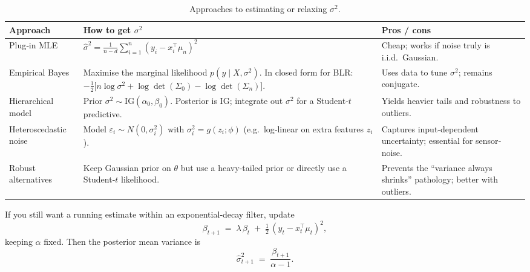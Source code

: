 \documentclass[11pt]{article}
\begin{document}
\begin{table}[ht]
  \small
  \centering
  \begin{tabularx}{\textwidth}{l X X}
    \toprule
    Approach & How to get \(\sigma^2\) & Pros / cons \\
    \midrule
    Plug‐in MLE
      & \(\displaystyle \hat\sigma^2
         = \frac{1}{n-d}\sum_{i=1}^n (y_i - x_i^\top \mu_n)^2\)
      & Cheap; works if noise truly is i.i.d.\ Gaussian. \\[1ex]
    Empirical Bayes
      & Maximise the marginal likelihood \(p(y\mid X,\sigma^2)\).
        In closed form for BLR: 
        \(-\tfrac12\bigl[n\log\sigma^2 + \log\det(\Sigma_0) - \log\det(\Sigma_n)\bigr]\).
      & Uses data to tune \(\sigma^2\); remains conjugate. \\[1ex]
    Hierarchical model
      & Prior \(\sigma^2\sim\mathrm{IG}(\alpha_0,\beta_0)\).  
        Posterior is IG; integrate out \(\sigma^2\) for a Student‐\(t\) predictive.
      & Yields heavier tails and robustness to outliers. \\[1ex]
    Heteroscedastic noise
      & Model \(\varepsilon_i\sim N(0,\sigma_i^2)\) with 
        \(\sigma_i^2 = g(z_i; \phi)\) (e.g.\ log‐linear on extra features \(z_i\)).
      & Captures input‐dependent uncertainty; essential for sensor‐noise. \\[1ex]
    Robust alternatives
      & Keep Gaussian prior on \(\theta\) but use a heavy‐tailed prior or
        directly use a Student‐\(t\) likelihood.
      & Prevents the “variance always shrinks” pathology; better with outliers. \\
    \bottomrule
  \end{tabularx}
  \caption{Approaches to estimating or relaxing \(\sigma^2\).}
  \label{tab:sigma2}
\end{table}

If you still want a running estimate within an exponential‐decay filter, update
\[
\beta_{t+1} \;=\; \lambda\,\beta_t \;+\; \tfrac12\,(y_t - x_t^\top \mu_t)^2,
\]
keeping \(\alpha\) fixed.  Then the posterior mean variance is
\[
\hat\sigma^2_{t+1} \;=\; \frac{\beta_{t+1}}{\alpha - 1}.
\]
\end{document}

